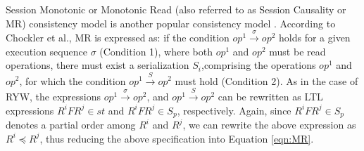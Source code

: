 \documentclass{sig-alternate-05-2015}
\begin{document}
 \par Session Monotonic or Monotonic Read (also referred to as Session Causality or MR) consistency model is
 another popular consistency model \cite{Chockler2000, Terry:1994:SGW:645792.668302}. According to Chockler et al.,
 MR is expressed as: if the condition $\mathit{op}^1 \xrightarrow{\sigma} \mathit{op}^2$ holds for a given execution sequence $\sigma$
  (Condition 1), where both $\mathit{op}^1$ and $\mathit{op}^2$ must be read operations,
  there must exist a serialization ${S_i}$,comprising the
   operations $\mathit{op}^1$ and $\mathit{op}^2$, for which the condition
  $\mathit{op}^1 \xrightarrow{S} \mathit{op}^2$ must hold (Condition 2).
 As in the case of RYW, the expressions $\mathit{op}^1 \xrightarrow{\sigma} \mathit{op}^2$,
  and $\mathit{op}^1 \xrightarrow{S} \mathit{op}^2$  can be rewritten as LTL expressions
   $R^i F R^j \in \mathit{st}$ and $R^i F R^j \in S_p$, respectively. Again, since $R^i F R^j \in S_p$ denotes a partial order among $R^i$ and $R^j$, we can rewrite the above expression as  $R^i \preccurlyeq R^j$, thus reducing the above specification  into Equation \ref{eqn:MR}. 
\end{document}
